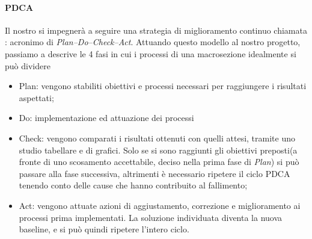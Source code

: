 \paragraph{PDCA}
Il nostro  si impegnerà a seguire una strategia di miglioramento continuo chiamata  : acronimo di \textit{Plan–Do–Check–Act}. Attuando questo modello al nostro progetto, passiamo a descrive le 4 fasi in cui i processi di una macrosezione idealmente si può dividere
\begin{itemize}
				\item Plan: vengono stabiliti obiettivi e processi necessari per raggiungere i risultati aspettati;
				\item Do: implementazione ed attuazione dei processi
				\item Check: vengono comparati i risultati ottenuti con quelli attesi, tramite uno studio tabellare e di grafici. Solo se si sono raggiunti gli obiettivi preposti(a fronte di uno scosamento accettabile, deciso nella prima fase di \textit{Plan}) si può passare alla fase successiva, altrimenti è necessario ripetere il ciclo PDCA tenendo conto delle cause che hanno contribuito al fallimento;
				\item Act: vengono attuate azioni di aggiustamento, correzione e miglioramento ai processi prima implementati. La soluzione individuata diventa la nuova baseline, e si può quindi ripetere l'intero ciclo.
			\end{itemize}


